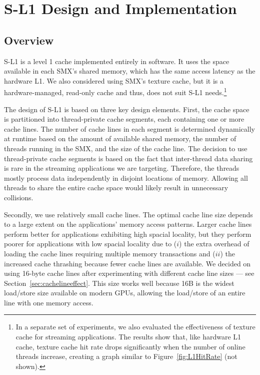 \section{S-L1 Design and Implementation} \label{sec:design}
\subsection{Overview}
\label{sec:overview}
S-L1 is a level 1 cache implemented entirely in software.
It uses the space available in each SMX's shared memory, which has the same access latency as the
hardware L1.
We also considered using SMX's texture cache, but it is a hardware-managed, read-only cache and
thus, does not suit S-L1 needs.\footnote{In a separate set of experiments, we also evaluated the effectiveness of texture cache
for streaming applications. The results show that, like hardware L1 cache, texture cache hit rate drops significantly
when the number of online threads increase, creating a graph similar to
Figure~\ref{fig:L1HitRate} (not shown).}%

The design of S-L1 is based on three key design elements.
First, the cache space is partitioned into thread-private cache segments, each containing one or
more cache lines. 
The number of cache lines in each segment is determined dynamically at runtime based on the
amount of available shared memory, the number of threads running in the SMX, and the size of the cache
line. 
The decision to use thread-private cache segments is based on the fact %
that
inter-thread data sharing is rare in the streaming applications we are targeting. Therefore, the threads mostly
process data independently in disjoint locations of memory.
Allowing all threads to share the entire cache space would likely result in unnecessary collisions.

Secondly, we use relatively small cache lines. 
The optimal cache line size depends to a large extent on the applications' memory access patterns.
Larger cache lines perform better for applications exhibiting high spacial locality,
but they perform poorer for applications with low spacial locality due to ($i$) the extra overhead
of loading the cache lines requiring multiple memory transactions and ($ii$) the increased cache
thrashing because fewer cache lines are available.
We decided on using 16-byte cache lines after experimenting with different cache line sizes --- see
Section~\ref{sec:cachelineeffect}. 
This size works well because 16B is the widest load/store size available on modern GPUs,
allowing the load/store of an entire line with one memory access.

